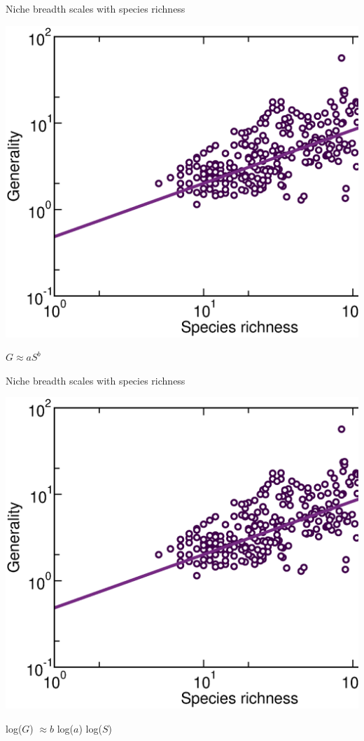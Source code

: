 \documentclass{beamer}
\begin{document}
  \begin{frame}{Niche breadth scales with species richness}

    \begin{center}
      \includegraphics*[width=.654\textwidth]{Figures/results/Gen_dots_vs_S_fitline_observed.eps}

    \vspace{.3cm}
      {\Large      
      $G \approx aS^b$}
    \end{center}
  \end{frame}

  \begin{frame}{Niche breadth scales with species richness}

    \begin{center}
      \includegraphics*[width=.654\textwidth]{Figures/results/Gen_dots_vs_S_fitline_observed.eps}

    \vspace{.3cm}
      {\Large      
      log($G$) $\approx b$  log($a$)  log($S$) }
    \end{center}
  \end{frame}
\end{document}
